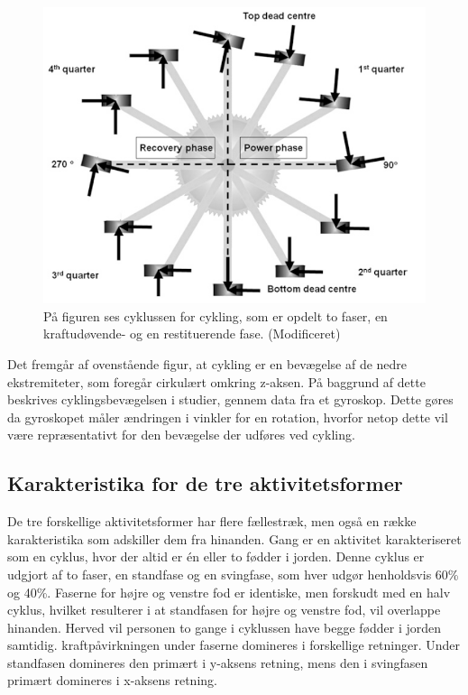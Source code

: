 \begin{figure}[H]
	\centering
	\includegraphics[scale=0.5]{figures/bProblemloesning/cykel_cyklus.png}
	\caption{På figuren ses cyklussen for cykling, som er opdelt to faser, en kraftudøvende- og en restituerende fase. \citep{Springer2014} (Modificeret)}
	\label{fig:cykel_cyklus}
\end{figure}

Det fremgår af ovenstående figur, at cykling er en bevægelse af de nedre ekstremiteter, som foregår cirkulært omkring z-aksen. På baggrund af dette beskrives cyklingsbevægelsen i studier, gennem data fra et gyroskop. Dette gøres da gyroskopet måler ændringen i vinkler for en rotation, hvorfor netop dette vil være repræsentativt for den bevægelse der udføres ved cykling. \citep{Cockcroft2011,Marin-PerianuMarin-Perianu2013}


\subsection{Karakteristika for de tre aktivitetsformer}
De tre forskellige aktivitetsformer har flere fællestræk, men også en række karakteristika som adskiller dem fra hinanden. \newline 
Gang er en aktivitet karakteriseret som en cyklus, hvor der altid er én eller to fødder i jorden. Denne cyklus er udgjort af to faser, en standfase og en svingfase, som hver udgør henholdsvis 60\% og 40\%.
Faserne for højre og venstre fod er identiske, men forskudt med en halv cyklus, hvilket resulterer i at standfasen for højre og venstre fod, vil overlappe hinanden. Herved vil personen to gange i cyklussen have begge fødder i jorden samtidig. \newline
kraftpåvirkningen under faserne domineres i forskellige retninger. Under standfasen domineres den primært i y-aksens retning, mens den i svingfasen primært domineres i x-aksens retning.

